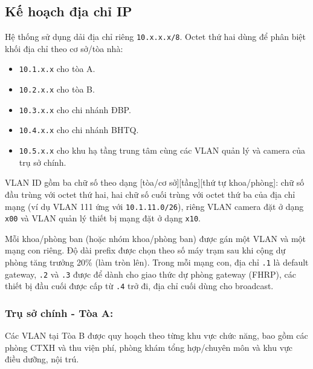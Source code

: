 \subsection{Kế hoạch địa chỉ IP}

Hệ thống sử dụng dải địa chỉ riêng \texttt{10.x.x.x/8}. Octet thứ hai dùng để phân biệt khối địa chỉ theo cơ sở/tòa nhà:
\begin{itemize}
    \item \texttt{10.1.x.x} cho tòa A.
    \item \texttt{10.2.x.x} cho tòa B.
    \item \texttt{10.3.x.x} cho chi nhánh ĐBP.
    \item \texttt{10.4.x.x} cho chi nhánh BHTQ.
    \item \texttt{10.5.x.x} cho khu hạ tầng trung tâm cùng các VLAN quản lý và camera của trụ sở chính.
\end{itemize}

VLAN ID gồm ba chữ số theo dạng [tòa/cơ sở][tầng][thứ tự khoa/phòng]: chữ số đầu trùng với octet thứ hai, hai chữ số cuối trùng với octet thứ ba của địa chỉ mạng (ví dụ VLAN 111 ứng với \texttt{10.1.11.0/26}), riêng VLAN camera đặt ở dạng \texttt{x00} và VLAN quản lý thiết bị mạng đặt ở dạng \texttt{x10}.

Mỗi khoa/phòng ban (hoặc nhóm khoa/phòng ban) được gán một VLAN và một mạng con riêng. Độ dài prefix được chọn theo số máy trạm sau khi cộng dự phòng tăng trưởng 20\% (làm tròn lên). Trong mỗi mạng con, địa chỉ \texttt{.1} là default gateway, \texttt{.2} và \texttt{.3} được để dành cho giao thức dự phòng gateway (FHRP), các thiết bị đầu cuối được cấp từ \texttt{.4} trở đi, địa chỉ cuối dùng cho broadcast.

\subsubsection{Trụ sở chính - Tòa A:}
Các VLAN tại Tòa B được quy hoạch theo từng khu vực chức năng, bao gồm các phòng CTXH và thu viện phí, phòng khám tổng hợp/chuyên môn và khu vực điều dưỡng, nội trú.

